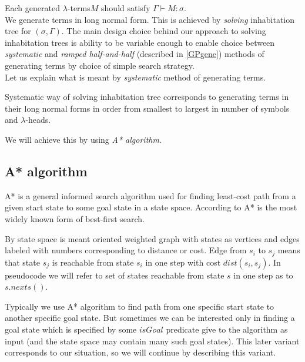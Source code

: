 \documentclass[12pt,a4paper]{report}
\newcommand{\Lets}{Let us\xspace}
\newcommand{\lterms}{$\lambda$-terms\xspace}
\newcommand{\lheads}{$\lambda$-heads\xspace}
\newcommand{\turst}[3]{$#1\vdash{}#2:#3$\xspace}
\newcommand{\GMS}{\turst{\Gamma}{M}{\sigma}}
\begin{document}
Each generated \lterms $M$ should  satisfy \GMS. \\

We generate terms in long normal form.
This is achieved by \textit{solving} inhabitation tree for $(\sigma,\Gamma)$.  
The main design choice behind our approach to solving inhabitation trees
is ability to be variable enough to enable choice between 
\textit{systematic}  
and \textit{ramped half-and-half} (described in \ref{GPgene}) 
methods of generating terms 
by choice of simple search strategy.\\

\Lets explain what is meant by \textit{systematic} 
method of generating terms. 

Systematic way of solving inhabitation tree corresponds to
generating terms in their long normal forms
in order from smallest to largest in number of symbols and \lheads.

We will achieve this by using \textit{A* algorithm}. 



\subsection{A* algorithm}

A* is a general informed search algorithm used for finding least-cost 
path from a given start state to some goal state in a state space.
According to \cite{AIAMA} A* is the most widely known form of best-first search.

By state space is meant oriented weighted graph with states as vertices and edges 
labeled with numbers corresponding to distance or cost. 
Edge from $s_i$ to $s_j$ means that state 
$s_j$ is reachable from state $s_i$ in one step with cost $dist(s_i,s_j)$.
In pseudocode we will refer to set of states reachable from 
state $s$ in one step as to $s.nexts()$.

Typically we use A* algorithm to find path from one specific start state to another 
specific goal state. But sometimes  
we can be interested only in finding a goal state which 
is specified by some $isGoal$ predicate give to the algorithm as
input (and the state space may contain many such goal states). 
This later variant corresponds to our situation, 
so we will continue by describing this variant.
\end{document}
